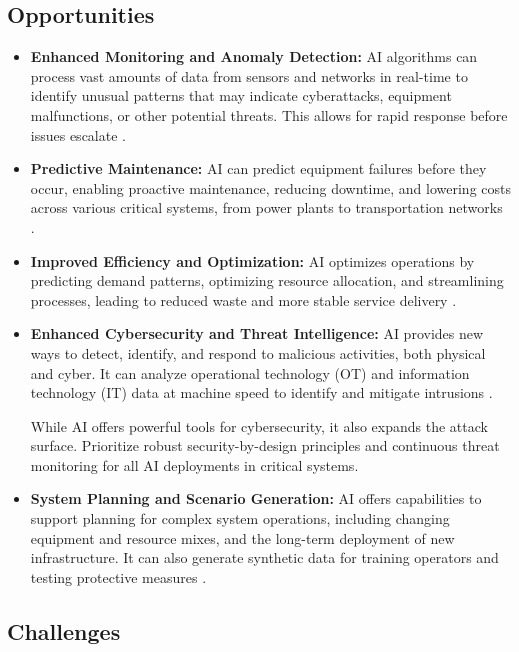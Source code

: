 \subsection{Opportunities}
\begin{itemize}
    \item \textbf{Enhanced Monitoring and Anomaly Detection:} AI algorithms can process vast amounts of data from sensors and networks in real-time to identify unusual patterns that may indicate cyberattacks, equipment malfunctions, or other potential threats. This allows for rapid response before issues escalate \parencite{DataFloq2023}.
    \item \textbf{Predictive Maintenance:} AI can predict equipment failures before they occur, enabling proactive maintenance, reducing downtime, and lowering costs across various critical systems, from power plants to transportation networks \parencite{EnergyGov2023}.
    \item \textbf{Improved Efficiency and Optimization:} AI optimizes operations by predicting demand patterns, optimizing resource allocation, and streamlining processes, leading to reduced waste and more stable service delivery \parencite{Checkpoint2023}.
    \item \textbf{Enhanced Cybersecurity and Threat Intelligence:} AI provides new ways to detect, identify, and respond to malicious activities, both physical and cyber. It can analyze operational technology (OT) and information technology (IT) data at machine speed to identify and mitigate intrusions \parencite{EAJournals2023}.

\begin{tipbox}
While AI offers powerful tools for cybersecurity, it also expands the attack surface. Prioritize robust security-by-design principles and continuous threat monitoring for all AI deployments in critical systems.
\end{tipbox}
    \item \textbf{System Planning and Scenario Generation:} AI offers capabilities to support planning for complex system operations, including changing equipment and resource mixes, and the long-term deployment of new infrastructure. It can also generate synthetic data for training operators and testing protective measures \parencite{EnergyGov2023}.
\end{itemize}

\subsection{Challenges}

